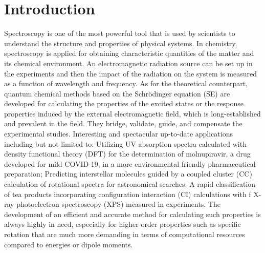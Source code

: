 \section{Introduction} \label{intro} 

Spectroscopy is one of the most powerful tool that is used by scientists to
understand the structure and properties of physical systems. In chemistry,
spectroscopy is applied for obtaining characteristic quantities of the matter
and its chemical environment. An electromagnetic radiation source can be set up
in the experiments and then the impact of the radiation on the system is
measured as a function of wavelength and frequency. \cite{Svanberg2023} As for
the theoretical counterpart, quantum chemical methods based on the
Schr\"odinger equation (SE) are developed for calculating the properties of the
excited states or the response properties induced by the external
electromagnetic field, which is long-established and prevalent  in the field.
They bridge, validate, guide, and compensate the experimental studies.
Interesting and spectacular up-to-date applications including but not limited
to: Utilizing UV absorption spectra calculated with density functional theory
(DFT) for the determination of molnupiravir, a drug developed for mild
COVID-19, in a more environmental friendly pharmaceutical
preparation;\cite{Abdelazim2023} Predicting interstellar molecules guided by a
coupled cluster (CC) calculation of rotational spectra for astronomical
searches;\cite{Puzzarini2023} A rapid classification of tea products
incorporating configuration interaction (CI) calculations with f X-ray
photoelectron spectroscopy (XPS) measured in experiments.\cite{Jiang2022} The
development of an efficient and accurate method for calculating such properties
is always highly in need, especially for higher-order properties such as
specific rotation that are much more demanding in terms of computational
resources compared to energies or dipole moments.

